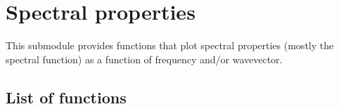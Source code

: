 \documentclass[letterpaper,10pt,english]{sphinxmanual}
\begin{document}

\begin{fulllineitems}
\label{\detokenize{functions:pyqcm.model_instance}}

\begin{fulllineitems}
\label{\detokenize{functions:pyqcm.model_instance.__init__}}
\end{fulllineitems}


\end{fulllineitems}



\chapter{Spectral properties}
\label{\detokenize{spectral:spectral-properties}}\label{\detokenize{spectral::doc}}
\sphinxAtStartPar
This submodule provides functions that plot spectral properties (mostly the spectral function) as a function of frequency and/or wavevector.


\section{List of functions}
\label{\detokenize{spectral:module-pyqcm.spectral}}\label{\detokenize{spectral:list-of-functions}}
\end{document}
